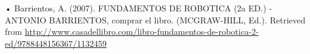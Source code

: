 •	Barrientos, A. (2007). FUNDAMENTOS DE ROBOTICA (2a ED.) - ANTONIO BARRIENTOS, comprar el libro. (MCGRAW-HILL, Ed.). Retrieved from \url{http://www.casadellibro.com/libro-fundamentos-de-robotica-2-ed/9788448156367/1132459}
